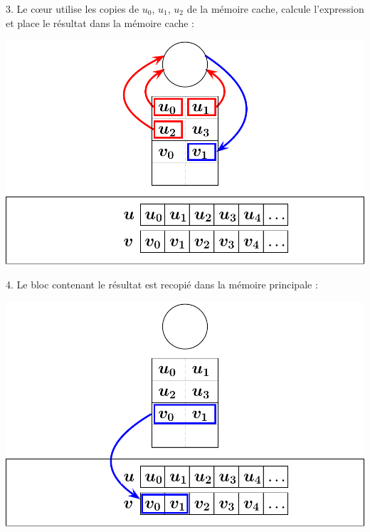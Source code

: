 \documentclass{beamer}
\begin{document}
\begin{frame}
	\parbox[t][1cm]{10cm}{3. Le c\oe ur utilise les copies de $u_0$, $u_1$, $u_2$ de la mémoire cache, calcule l'expression et place le résultat dans la mémoire cache :}
	\begin{center}
		\includegraphics[scale=0.6]{../../Images/sequentiel2}
	\end{center}
\end{frame}
\begin{frame}
	\parbox[t][1cm]{10cm}{4. Le bloc contenant le résultat est recopié dans la mémoire principale :}
	\begin{center}
		\includegraphics[scale=0.6]{../../Images/sequentiel3}
	\end{center}
\end{frame}
\end{document}

